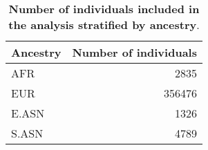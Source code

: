 \begin{table}[ht]
\centering
\begingroup\scriptsize
\begin{tabular}{lr}
  \toprule
{\textbf{Ancestry}} & {\textbf{Number of individuals}} \\ 
  \midrule
AFR &    2835 \\ 
  EUR &  356476 \\ 
  E.ASN &    1326 \\ 
  S.ASN &    4789 \\ 
   \bottomrule
\end{tabular}
\endgroup
\caption{\textbf{Number of individuals included in the analysis stratified by ancestry}.} 
\label{tab:indiv_table}
\end{table}
